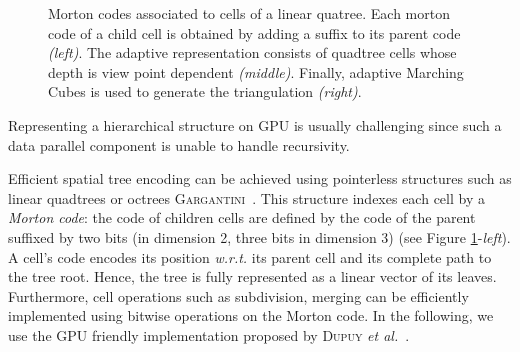 \documentclass{llncs}
\newcommand{\wrt}{\emph{w.r.t.}\xspace}
\begin{document}
\begin{figure}[!htbp]
  \vspace{-0.35cm}
  \begin{center}
  \end{center}
  \vspace{-0.35cm}
\caption{Morton codes associated to cells of a linear quatree. Each
   morton code of a child cell is obtained by adding a suffix to its
  parent code \emph{(left)}. The adaptive representation consists of
  quadtree cells whose depth is view point dependent
  \emph{(middle)}. Finally, adaptive Marching Cubes is used to
  generate the triangulation \emph{(right)}.}
\label{fig_quadtree_partitionning}
\end{figure}

Representing a hierarchical structure on GPU is usually challenging since
such a data parallel component is unable to handle recursivity.


Efficient spatial tree encoding can be
achieved using pointerless structures such as linear quadtrees or octrees
 \textsc{Gargantini}~\cite{gargantini1982effective}. This structure
indexes each cell by a \emph{Morton code}: the code of children
cells are defined by the code of the parent suffixed by two bits (in dimension
2, three bits in dimension 3) (see Figure
\ref{fig_quadtree_partitionning}-\emph{left}). A cell's code encodes its
position \wrt its parent cell and its complete path to the tree root.
Hence, the tree is fully represented as a linear vector of its leaves.
Furthermore, cell operations such as subdivision, merging %
can be efficiently implemented using bitwise operations on the Morton
code. In the following, we use the GPU
friendly
implementation proposed by \textsc{Dupuy}
\textit{et al.}~\cite{dupuy2014quadtrees}.%
\end{document}

